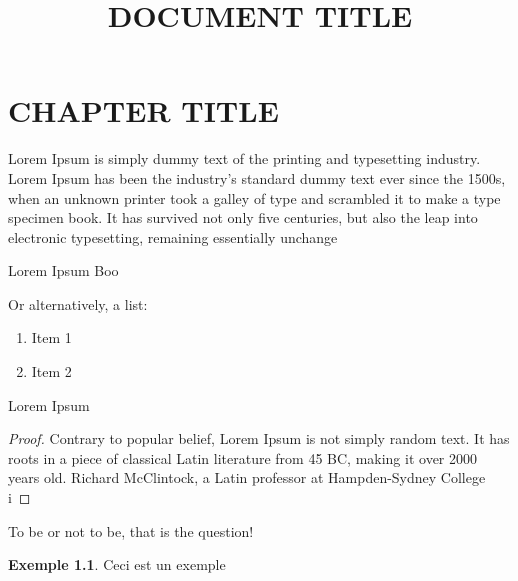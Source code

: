 \documentclass[12pt]{report}
\title{DOCUMENT TITLE}
\theoremstyle{definition}
\newtheorem*{example}{Exemple}
\begin{document}
\chapter{CHAPTER TITLE}
    Lorem Ipsum is simply dummy text of the printing and typesetting industry. 
    Lorem Ipsum has been the industry's standard dummy text ever since the 1500s, 
    when an unknown printer took a galley of type and scrambled it to make a type specimen book. It has survived not only five centuries, but also the leap into electronic typesetting, remaining essentially unchange
    
    \begin{defi}
        \label{def:DEFINITION}
        Lorem Ipsum Boo
    \end{defi}

    Or alternatively, a list:
    \begin{enumerate}
        \setlength{\itemsep}{0pt}
        \item Item 1
        \item Item 2
    \end{enumerate}

    \begin{prop}
        \label{thm:THEOREM}
        Lorem Ipsum
    \end{prop}
    \begin{proof}
        Contrary to popular belief, Lorem Ipsum is not simply random text. 
        It has roots in a piece of classical Latin literature from 45 BC, 
        making it over 2000 years old. Richard McClintock, a Latin professor at Hampden-Sydney College i
    \end{proof}

    \begin{attention}
        To be or not to be, that is the question!
    \end{attention}


    \begin{example}
        Ceci est un exemple
    \end{example}
\end{document}
